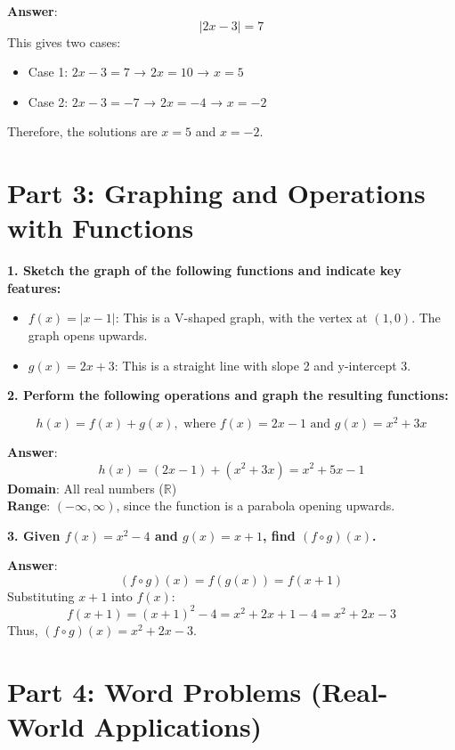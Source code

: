 \documentclass{article}
\begin{document}
\textbf{Answer}: 
\[
|2x - 3| = 7
\]
This gives two cases:
\begin{itemize}
    \item Case 1: \( 2x - 3 = 7 \) → \( 2x = 10 \) → \( x = 5 \)
    \item Case 2: \( 2x - 3 = -7 \) → \( 2x = -4 \) → \( x = -2 \)
\end{itemize}
Therefore, the solutions are \( x = 5 \) and \( x = -2 \).

\newpage

\section*{Part 3: Graphing and Operations with Functions}

\textbf{1. Sketch the graph of the following functions and indicate key features:}

\begin{itemize}
    \item \( f(x) = |x - 1| \): This is a V-shaped graph, with the vertex at \( (1, 0) \). The graph opens upwards.
    \item \( g(x) = 2x + 3 \): This is a straight line with slope 2 and y-intercept 3.
\end{itemize}

\bigskip

\textbf{2. Perform the following operations and graph the resulting functions:}

\[
h(x) = f(x) + g(x), \text{ where } f(x) = 2x - 1 \text{ and } g(x) = x^2 + 3x
\]

\textbf{Answer}: 
\[
h(x) = (2x - 1) + (x^2 + 3x) = x^2 + 5x - 1
\]
\textbf{Domain}: All real numbers (\( \mathbb{R} \)) \\
\textbf{Range}: \( (-\infty, \infty) \), since the function is a parabola opening upwards.

\bigskip

\textbf{3. Given \( f(x) = x^2 - 4 \) and \( g(x) = x + 1 \), find \( (f \circ g)(x) \).}

\textbf{Answer}: 
\[
(f \circ g)(x) = f(g(x)) = f(x + 1)
\]
Substituting \( x + 1 \) into \( f(x) \):
\[
f(x + 1) = (x + 1)^2 - 4 = x^2 + 2x + 1 - 4 = x^2 + 2x - 3
\]
Thus, \( (f \circ g)(x) = x^2 + 2x - 3 \).

\newpage

\section*{Part 4: Word Problems (Real-World Applications)}
\end{document}
